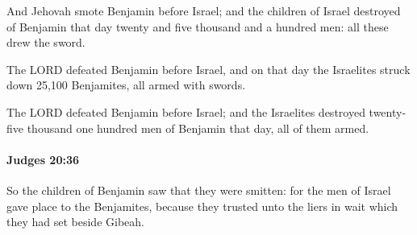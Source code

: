 			\begin{versebox}
					\item[BHS] 
					\item[ASV] And Jehovah smote Benjamin before Israel; and the children of Israel destroyed of Benjamin that day twenty and five thousand and a hundred men: all these drew the sword.
					\item[NIV] The LORD defeated Benjamin before Israel, and on that day the Israelites struck down 25,100 Benjamites, all armed with swords.
					\item[NRSV] The LORD defeated Benjamin before Israel; and the Israelites destroyed twenty-five thousand one hundred men of Benjamin that day, all of them armed.
			\end{versebox}

		\paragraph{Judges 20:36} %
			\label{JUDGES-20-36}

			So the children of Benjamin saw that they were smitten: for the men of Israel gave place to the Benjamites, because they trusted unto the liers in wait which they had set beside Gibeah.

